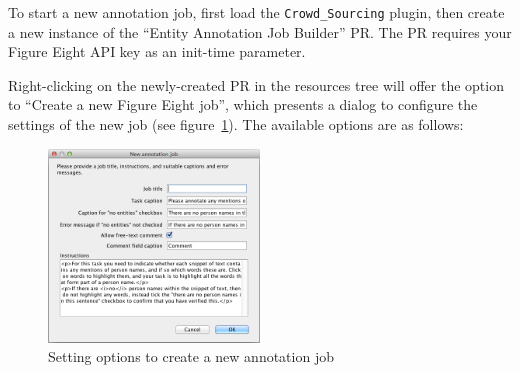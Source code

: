 
To start a new annotation job, first load the \verb!Crowd_Sourcing! plugin,
then create a new instance of the ``Entity Annotation Job Builder'' PR.
The PR requires your Figure Eight API key as an init-time parameter.

Right-clicking on the newly-created PR in the resources tree will offer the
option to ``Create a new Figure Eight job'', which presents a dialog to
configure the settings of the new job (see
figure~\ref{fig:crowd:new-annotation-job}).  The available options are as
follows:

\begin{figure}[tb]
  \centering
  \includegraphics[width=0.5\textwidth]{new-annotation-job-dialog.png}
  \caption{Setting options to create a new annotation job}
  \label{fig:crowd:new-annotation-job}
\end{figure}


